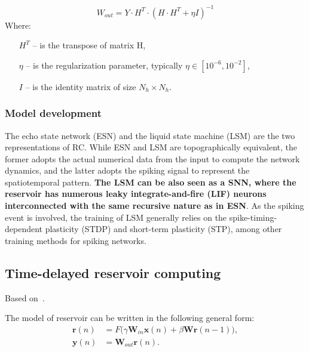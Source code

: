 \documentclass[11pt, oneside]{article}
\begin{document}
\begin{equation}
    W_{out} = Y \cdot H^{T} \cdot (H \cdot H^{T} + \eta I)^{-1}
\end{equation}
Where:
\begin{itemize}[noitemsep, leftmargin=2cm, label={}]
    \item [\(H^{T}\)] -- is the transpose of matrix H,
    \item [\(\eta\)] -- is the regularization parameter, typically \(\eta \in [10^{-6}, 10^{-2}]\),
    \item [\(I\)] -- is the identity matrix of size \(N_h \times N_h\).
\end{itemize}


\subsubsection{Model development}


The echo state network (ESN)  and the liquid state machine (LSM)  are the two representations of RC.  While ESN and LSM are topographically equivalent, the former adopts the actual numerical data from the input to compute the network dynamics, and the latter adopts the spiking signal to represent the spatiotemporal pattern. \textbf{The LSM can be also seen as a SNN, where the reservoir has numerous leaky integrate-and-fire (LIF) neurons interconnected with the same recursive nature as in ESN}. As the spiking event is involved, the training of LSM generally relies on the spike-timing-dependent plasticity (STDP)  and short-term plasticity (STP), among other training methods for spiking networks.


\subsection{Time-delayed reservoir computing}
Based on~\autocite{Grigoryeva2016, Parlitz2024, Ortn2015}.

The model of reservoir can be written in the following general form:
\begin{align}
    \mathbf{r}(n) & = F\big( \gamma \mathbf{W}_{in} \mathbf{x}(n) + \beta \mathbf{W} \mathbf{r}(n-1) \big), \\
    \mathbf{y}(n) & = \mathbf{W}_{out} \mathbf{r}(n).
    \label{eq:tdrc}
\end{align}
\end{document}
